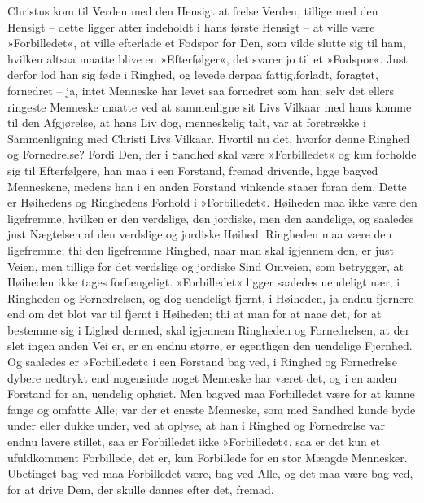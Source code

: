 \documentclass[12pt,a4paper]{article}
\begin{document}
Christus kom til Verden med den Hensigt at frelse Verden, tillige med den Hensigt – dette ligger atter indeholdt i hans første Hensigt – at ville være »Forbilledet«, at ville efterlade et Fodspor for Den, som vilde slutte sig til ham, hvilken altsaa maatte blive en »Efterfølger«, det svarer jo til et »Fodspor«. Just derfor lod han sig føde i Ringhed, og levede derpaa fattig,forladt, foragtet, fornedret – ja, intet Menneske har levet saa fornedret som han; selv det ellers ringeste Menneske maatte ved at sammenligne sit Livs Vilkaar med hans komme til den Afgjørelse, at hans Liv dog, menneskelig talt, var at foretrække i Sammenligning med Christi Livs Vilkaar. Hvortil nu det, hvorfor denne Ringhed og Fornedrelse? Fordi Den, der i Sandhed skal være »Forbilledet« og kun forholde sig til Efterfølgere, han maa i een Forstand, fremad drivende, ligge bagved Menneskene, medens han i en anden Forstand vinkende staaer foran dem. Dette er Høihedens og Ringhedens Forhold i »Forbilledet«. Høiheden maa ikke være den ligefremme, hvilken er den verdslige, den jordiske, men den aandelige, og saaledes just Nægtelsen af den verdslige og jordiske Høihed. Ringheden maa være den ligefremme; thi den ligefremme Ringhed, naar man skal igjennem den, er just Veien, men tillige for det verdslige og jordiske Sind Omveien, som betrygger, at Høiheden ikke tages forfængeligt. »Forbilledet« ligger saaledes uendeligt nær, i Ringheden og Fornedrelsen, og dog uendeligt fjernt, i Høiheden, ja endnu fjernere end om det blot var til fjernt i Høiheden; thi at man for at naae det, for at bestemme sig i Lighed dermed, skal igjennem Ringheden og Fornedrelsen, at der slet ingen anden Vei er, er en endnu større, er egentligen den uendelige Fjernhed. Og saaledes er »Forbilledet« i een Forstand bag ved, i Ringhed og Fornedrelse dybere nedtrykt end nogensinde noget Menneske har været det, og i en anden Forstand for an, uendelig ophøiet. Men bagved maa Forbilledet være for at kunne fange og omfatte Alle; var der et eneste Menneske, som med Sandhed kunde byde under eller dukke under, ved at oplyse, at han i Ringhed og Fornedrelse var endnu lavere stillet, saa er Forbilledet ikke »Forbilledet«, saa er det kun et ufuldkomment Forbillede, det er, kun Forbillede for en stor Mængde Mennesker. Ubetinget bag ved maa Forbilledet være, bag ved Alle, og det maa være bag ved, for at drive Dem, der skulle dannes efter det, fremad.
\end{document}
